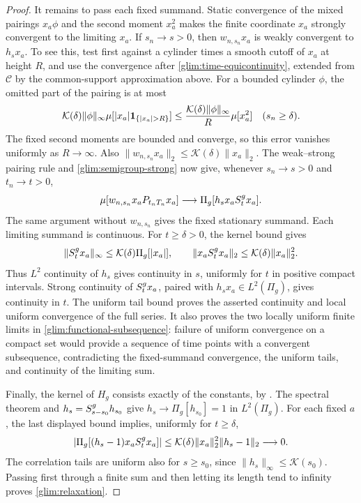\begin{proof}
It remains to pass each fixed summand.  Static convergence of the mixed
pairings \(x_a\phi\) and the second moment \(x_a^2\) makes the finite
coordinate \(x_a\) strongly
convergent to the limiting \(x_a\).  If \(s_n\to s>0\), then
\(w_{n,s_n}x_a\) is weakly convergent to \(h_sx_a\).  To see this,
test first against a cylinder times a smooth cutoff of \(x_a\) at
height \(R\), and use the convergence after
\eqref{glim:time-equicontinuity}, extended from \(\mathscr C\) by the
common-support approximation above.  For a bounded cylinder \(\phi\),
the omitted part of the pairing is at most
\[
 \mathcal K(\delta)\|\phi\|_\infty
       \mu[|x_a|\ind_{\{|x_a|>R\}}]
 \le \frac{\mathcal K(\delta)\|\phi\|_\infty}{R}\mu[x_a^2]
 \quad(s_n\ge\delta).
\]
The fixed second moments are bounded and converge, so this error
vanishes uniformly as \(R\to\infty\).  Also
\(\|w_{n,s_n}x_a\|_2\le \mathcal K(\delta)\|x_a\|_2\).
The weak--strong pairing rule and
\eqref{glim:semigroup-strong} now give, whenever \(s_n\to s>0\) and
\(t_n\to t>0\),
\[
 \mu[w_{n,s_n}x_aP_{t_nT_n}x_a]
       \longrightarrow \Pi_g[h_sx_aS^g_t x_a].
\]
The same argument without \(w_{n,s_n}\) gives the fixed stationary
summand.  Each limiting summand is continuous.  For \(t\ge\delta>0\), the kernel
bound gives
\[
 \|S^g_t x_a\|_\infty\le \mathcal K(\delta)\Pi_g[|x_a|],\qquad
 \|x_aS^g_t x_a\|_2\le \mathcal K(\delta)\|x_a\|_2^2.
\]
Thus \(L^2\) continuity of \(h_s\) gives continuity in \(s\),
uniformly for \(t\) in positive compact intervals.  Strong
continuity of \(S^g_t x_a\), paired with \(h_sx_a\in L^2(\Pi_g)\),
gives continuity in \(t\).  The uniform tail bound proves the
asserted continuity and local uniform convergence of the full series.
It also proves the two locally uniform finite limits in
\eqref{glim:functional-subsequence}: failure of uniform convergence
on a compact set would provide a sequence of time points with a
convergent subsequence, contradicting the fixed-summand convergence,
the uniform tails, and continuity of the limiting sum.

Finally, the kernel of \(H_g\) consists exactly of the constants,
by \cite[Proposition~5.1]{FUA}.  The spectral theorem and
\(h_s=S^g_{s-s_0}h_{s_0}\) give \(h_s\to\Pi_g[h_{s_0}]=1\) in
\(L^2(\Pi_g)\).  For each fixed \(a\), the last displayed bound
implies, uniformly for \(t\ge\delta\),
\[
 |\Pi_g[(h_s-1)x_aS^g_t x_a]|
 \le \mathcal K(\delta)\|x_a\|_2^2\|h_s-1\|_2\longrightarrow0.
\]
The correlation tails are uniform also for \(s\ge s_0\), since
\(\|h_s\|_\infty\le \mathcal K(s_0)\).  Passing first through a finite sum and
then letting its length tend to infinity proves
\eqref{glim:relaxation}.
\end{proof}

